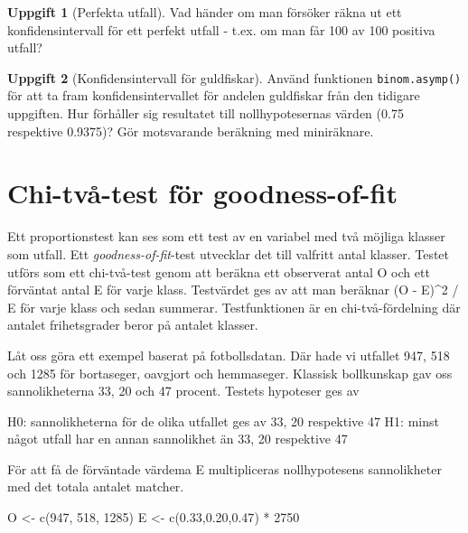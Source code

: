\documentclass[
]{book}
\newenvironment{Shaded}{\begin{snugshade}}{\end{snugshade}}
\newcommand{\DecValTok}[1]{\textcolor[rgb]{0.00,0.00,0.81}{#1}}
\newcommand{\FloatTok}[1]{\textcolor[rgb]{0.00,0.00,0.81}{#1}}
\newcommand{\FunctionTok}[1]{\textcolor[rgb]{0.00,0.00,0.00}{#1}}
\newcommand{\NormalTok}[1]{#1}
\newcommand{\OtherTok}[1]{\textcolor[rgb]{0.56,0.35,0.01}{#1}}
\newcommand{\SpecialCharTok}[1]{\textcolor[rgb]{0.00,0.00,0.00}{#1}}
\theoremstyle{definition}
\theoremstyle{definition}
\theoremstyle{definition}
\newtheorem{exercise}{Uppgift}[chapter]
\theoremstyle{definition}
\theoremstyle{remark}
\begin{document}
\begin{exercise}[Perfekta utfall]
Vad händer om man försöker räkna ut ett konfidensintervall för ett perfekt utfall - t.ex. om man får 100 av 100 positiva utfall?
\end{exercise}

\begin{exercise}[Konfidensintervall för guldfiskar]
Använd funktionen \texttt{binom.asymp()} för att ta fram konfidensintervallet för andelen guldfiskar från den tidigare uppgiften. Hur förhåller sig resultatet till nollhypotesernas värden (0.75 respektive 0.9375)? Gör motsvarande beräkning med miniräknare.
\end{exercise}

\hypertarget{chi-tvuxe5-test-fuxf6r-goodness-of-fit}{%
\section{Chi-två-test för goodness-of-fit}\label{chi-tvuxe5-test-fuxf6r-goodness-of-fit}}

Ett proportionstest kan ses som ett test av en variabel med två möjliga klasser som utfall. Ett \emph{goodness-of-fit}-test utvecklar det till valfritt antal klasser. Testet utförs som ett chi-två-test genom att beräkna ett observerat antal O och ett förväntat antal E för varje klass. Testvärdet ges av att man beräknar (O - E)\^{}2 / E för varje klass och sedan summerar. Testfunktionen är en chi-två-fördelning där antalet frihetsgrader beror på antalet klasser.

Låt oss göra ett exempel baserat på fotbollsdatan. Där hade vi utfallet 947, 518 och 1285 för bortaseger, oavgjort och hemmaseger. Klassisk bollkunskap gav oss sannolikheterna 33, 20 och 47 procent. Testets hypoteser ges av

H0: sannolikheterna för de olika utfallet ges av 33, 20 respektive 47
H1: minst något utfall har en annan sannolikhet än 33, 20 respektive 47

För att få de förväntade värdema E multipliceras nollhypotesens sannolikheter med det totala antalet matcher.

\begin{Shaded}
\begin{Highlighting}[]
\NormalTok{O }\OtherTok{\textless{}{-}} \FunctionTok{c}\NormalTok{(}\DecValTok{947}\NormalTok{, }\DecValTok{518}\NormalTok{, }\DecValTok{1285}\NormalTok{)}
\NormalTok{E }\OtherTok{\textless{}{-}} \FunctionTok{c}\NormalTok{(}\FloatTok{0.33}\NormalTok{,}\FloatTok{0.20}\NormalTok{,}\FloatTok{0.47}\NormalTok{) }\SpecialCharTok{*} \DecValTok{2750}
\end{Highlighting}
\end{Shaded}
\end{document}
